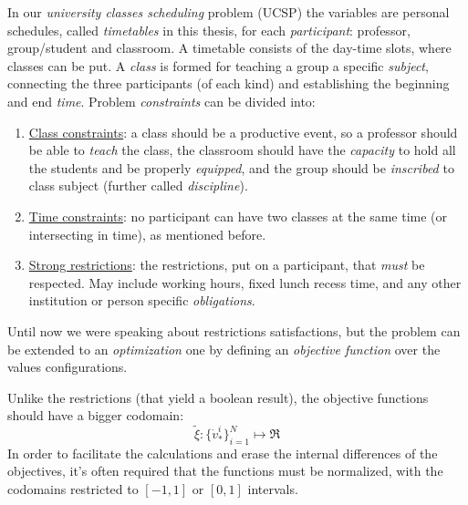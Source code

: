   In our \emph{university classes scheduling} problem (UCSP) the variables
are personal schedules, called \emph{timetables} in this thesis,
for each \emph{participant}: professor, group/student and classroom.
  A timetable consists of the day-time slots, where classes can be put.
  A \emph{class} is formed for teaching a group a specific \emph{subject},
connecting the three participants (of each kind) and establishing
the beginning and end \emph{time}.
  Problem \emph{constraints} can be divided into:
\begin{enumerate}
  \item \underline{Class constraints}: a class should be a productive event, so
    a professor should be able to \emph{teach} the class, the classroom should
    have the \emph{capacity} to hold all the students and be properly \emph{equipped},
    and the group should be \emph{inscribed} to class subject
    (further called \emph{discipline}).
  \item \underline{Time constraints}: no participant can have two classes
    at the same time (or intersecting in time), as mentioned before.
  \item \underline{Strong restrictions}: the restrictions, put on a participant, that
    \emph{must} be respected. May include working hours, fixed lunch recess time,
    and any other institution or person specific \emph{obligations}.
\end{enumerate}

\bigskip

  Until now we were speaking about restrictions satisfactions, but the problem can
be extended to an \emph{optimization} one by defining an
\emph{objective function} over the values configurations.

  Unlike the restrictions (that yield a boolean result), the objective functions
should have a bigger codomain:
$$\tilde\xi : \{{\dot v}^i_\ast\}_{i=1}^N \mapsto \Re$$
  In order to facilitate the calculations and erase the internal differences of
the objectives, it's often required that the functions must be normalized,
with the codomains restricted to $[-1,1]$ or $[0,1]$ intervals.

